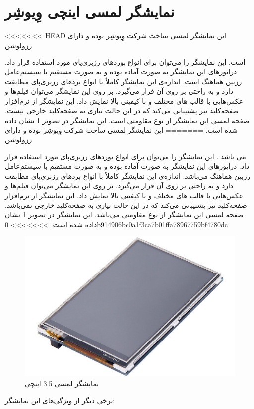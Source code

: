 \section{نمایشگر لمسی  اینچی وِیوشِر}
<<<<<<< HEAD
این نمایشگر لمسی ساخت شرکت وِیوشِر بوده و دارای رزولوشن  { است. این نمایشگر را می‌توان برای انواع بوردهای رزبری‌پای مورد استفاده قرار داد. درایورهای این نمایشگر به صورت آماده بوده و به صورت مستقیم با  سیستم‌عامل رزبین هماهنگ است. اندازه‌ی این نمایشگر کاملاً با انواع بردهای رزبری‌پای مطابقت دارد و به راحتی بر روی آن قرار می‌گیرد. بر روی این نمایشگر می‌توان فیلم‌ها و عکس‌هایی با قالب‌ های مختلف و با کیفیتی بالا نمایش داد. این نمایشگر از نرم‌افزار صفحه‌کلید نیز پشتیبانی می‌کند که در این حالت نیازی به صفحه‌کلید خارجی نیست. صفحه لمسی این نمایشگر از نوع مقاومتی است. این نمایشگر در تصویر \ref{lcd} نشان داده شده است.
=======
این نمایشگر لمسی ساخت شرکت وِیوشِر بوده و دارای رزولوشن  { می باشد . این نمایشگر را می‌توان برای انواع بوردهای رزبری‌پای مورد استفاده قرار داد. درایورهای این نمایشگر به صورت آماده بوده و به صورت مستقیم با  سیستم‌عامل رزبین هماهنگ می‌باشد. اندازه‌ی این نمایشگر کاملاً با انواع بردهای رزبری‌پای مطابقت دارد و به راحتی بر روی آن قرار می‌گیرد. بر روی این نمایشگر می‌توان فیلم‌ها و عکس‌هایی با قالب‌ های مختلف و با کیفیتی بالا نمایش داد. این نمایشگر از نرم‌افزار صفحه‌کلید نیز پشتیبانی می‌کند که در این حالت نیازی به صفحه‌کلید خارجی نمی‌باشد. صفحه لمسی این نمایشگر از نوع مقاومتی می‌باشد. این نمایشگر در تصویر \ref{lcd} نشان داده شده است.
>>>>>>> 0b914906bc0a1f3ca7b01ffa78967759bf4780dc

\begin{figure}[t!]
    \centering
    \includegraphics[scale=0.30]{figures/lcd.png}
    \caption{نمایشگر لمسی 3.5 اینچی}
    \label{lcd}
\end{figure}
\clearpage
برخی دیگر از ویژگی‌های این نمایشگر:

}}
